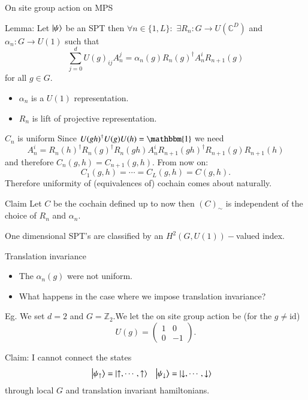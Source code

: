 \documentclass{beamer}
\newcommand{\id}{\mathbbm{1}}
\newcommand{\CC}{\mathbb{C}}
\newcommand{\ZZ}{\mathbb{Z}}
\begin{document}
\begin{frame}{On site group action on MPS}
\begin{block}{Lemma:}
Let $\ket{\psi}$ be an SPT then $\forall n\in\{1,L\}:$ $\exists R_n:G\rightarrow U(\CC^D)$ and $\alpha_n:G\rightarrow U(1)$ such that
\begin{equation}
\sum_{j=0}^{d}U(g)_{ij}A^j_n=\alpha_n(g) R_n(g)^\dagger A^i_n R_{n+1}(g)
\end{equation}
for all $g\in G.$
\end{block}
\pause
\begin{itemize}
\item $\alpha_n$ is a $U(1)$ representation.
\item $R_n$ is lift of projective representation.
\end{itemize}
\end{frame}

\begin{frame}{$C_n$ is uniform}
Since $U(gh)^\dagger U(g)U(h)=\id$ we need
\begin{equation}
A_n^i=R_n(h)^\dagger R_n(g)^\dagger R_{n}(gh) A^i_n R_{n+1}(gh)^\dagger R_{n+1}(g) R_{n+1}(h)
\end{equation}
and therefore $C_n(g,h)=C_{n+1}(g,h)$. From now on:
\[C_1(g,h)=\cdots=C_L(g,h)=C(g,h).\]
\pause
Therefore uniformity of (equivalences of) cochain comes about naturally.
\pause
\begin{block}{Claim}
Let $C$ be the cochain defined up to now then $(C)_\sim$ is independent of the choice of $R_n$ and $\alpha_n$.
\end{block}
\pause
One dimensional SPT's are classified by an $H^2(G,U(1))-$valued index.
\end{frame}

\begin{frame}{Translation invariance}
\begin{itemize}
\item The $\alpha_n(g)$ were not uniform.
\pause
\item What happens in the case where we impose translation invariance?
\end{itemize}
Eg. We set $d=2$ and $G=\ZZ_2$.\pause We let the on site group action be (for the $g\neq \text{id}$)
\[U(g)=\begin{pmatrix}1&0\\0&-1\end{pmatrix}.\]
\pause
\begin{block}{Claim:}
I cannot connect the states
\begin{align*}
\ket{\psi_\uparrow}&=\ket{\uparrow,\cdots,\uparrow}&\ket{\psi_\downarrow}&=\ket{\downarrow,\cdots,\downarrow}
\end{align*}
through local $G$ and translation invariant hamiltonians.
\end{block}
\end{frame}
\end{document}
